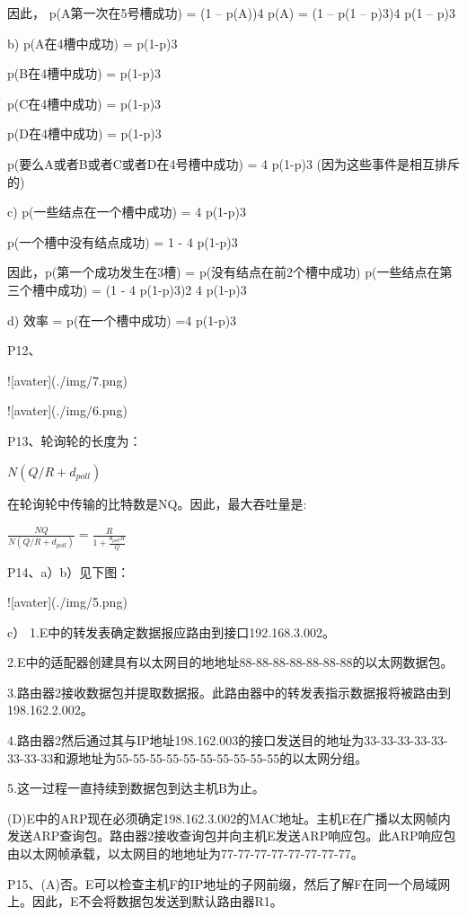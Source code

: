 \documentclass[11pt,UTF8,twoside]{article}
\begin{document}
{		因此， p(A第一次在5号槽成功) = (1 – p(A))4 p(A) = (1 – p(1 – p)3)4 p(1 – p)3 
		
		b) p(A在4槽中成功) = p(1-p)3 
		
		p(B在4槽中成功) = p(1-p)3 
		
		p(C在4槽中成功) = p(1-p)3 
		
		p(D在4槽中成功) = p(1-p)3 
		
		p(要么A或者B或者C或者D在4号槽中成功) = 4 p(1-p)3 (因为这些事件是相互排斥的) 
		
		c) p(一些结点在一个槽中成功) = 4 p(1-p)3 
		
		p(一个槽中没有结点成功) = 1 - 4 p(1-p)3
		
		因此，p(第一个成功发生在3槽) = p(没有结点在前2个槽中成功) p(一些结点在第三个槽中成功) = (1 - 4 p(1-p)3)2 4 p(1-p)3 
		
		d) 效率 = p(在一个槽中成功) =4 p(1-p)3 
		
		
		P12、
		
		![avater](./img/7.png)
		
		![avater](./img/6.png)
		
		P13、轮询轮的长度为：
		
		$N(Q/R+d_{poll})$
		
		在轮询轮中传输的比特数是NQ。因此，最大吞吐量是:
		
		$\frac{NQ}{N(Q/R+d_{poll})}=\frac{R}{1+\frac{d_{poll}R}{Q}}$
		
		P14、a）b）见下图：
		
		![avater](./img/5.png)
		
		c）
		1.E中的转发表确定数据报应路由到接口192.168.3.002。
		
		2.E中的适配器创建具有以太网目的地地址88-88-88-88-88-88-88的以太网数据包。
		
		3.路由器2接收数据包并提取数据报。此路由器中的转发表指示数据报将被路由到198.162.2.002。
		
		4.路由器2然后通过其与IP地址198.162.003的接口发送目的地址为33-33-33-33-33-33-33-33和源地址为55-55-55-55-55-55-55-55-55-55的以太网分组。
		
		5.这一过程一直持续到数据包到达主机B为止。
		
		(D)E中的ARP现在必须确定198.162.3.002的MAC地址。主机E在广播以太网帧内发送ARP查询包。路由器2接收查询包并向主机E发送ARP响应包。此ARP响应包由以太网帧承载，以太网目的地地址为77-77-77-77-77-77-77-77。
		
		P15、(A)否。E可以检查主机F的IP地址的子网前缀，然后了解F在同一个局域网上。因此，E不会将数据包发送到默认路由器R1。
		
}
\end{document}

